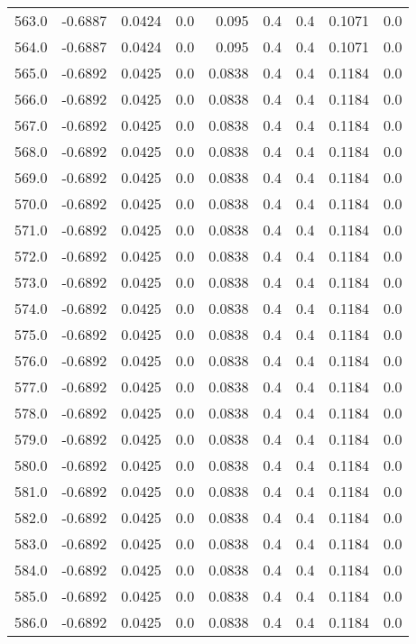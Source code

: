 \begin{longtable}{lrrrrrrrr}
563.0 & -0.6887 & 0.0424 & 0.0 & 0.095 & 0.4 & 0.4 & 0.1071 & 0.0 \\
564.0 & -0.6887 & 0.0424 & 0.0 & 0.095 & 0.4 & 0.4 & 0.1071 & 0.0 \\
565.0 & -0.6892 & 0.0425 & 0.0 & 0.0838 & 0.4 & 0.4 & 0.1184 & 0.0 \\
566.0 & -0.6892 & 0.0425 & 0.0 & 0.0838 & 0.4 & 0.4 & 0.1184 & 0.0 \\
567.0 & -0.6892 & 0.0425 & 0.0 & 0.0838 & 0.4 & 0.4 & 0.1184 & 0.0 \\
568.0 & -0.6892 & 0.0425 & 0.0 & 0.0838 & 0.4 & 0.4 & 0.1184 & 0.0 \\
569.0 & -0.6892 & 0.0425 & 0.0 & 0.0838 & 0.4 & 0.4 & 0.1184 & 0.0 \\
570.0 & -0.6892 & 0.0425 & 0.0 & 0.0838 & 0.4 & 0.4 & 0.1184 & 0.0 \\
571.0 & -0.6892 & 0.0425 & 0.0 & 0.0838 & 0.4 & 0.4 & 0.1184 & 0.0 \\
572.0 & -0.6892 & 0.0425 & 0.0 & 0.0838 & 0.4 & 0.4 & 0.1184 & 0.0 \\
573.0 & -0.6892 & 0.0425 & 0.0 & 0.0838 & 0.4 & 0.4 & 0.1184 & 0.0 \\
574.0 & -0.6892 & 0.0425 & 0.0 & 0.0838 & 0.4 & 0.4 & 0.1184 & 0.0 \\
575.0 & -0.6892 & 0.0425 & 0.0 & 0.0838 & 0.4 & 0.4 & 0.1184 & 0.0 \\
576.0 & -0.6892 & 0.0425 & 0.0 & 0.0838 & 0.4 & 0.4 & 0.1184 & 0.0 \\
577.0 & -0.6892 & 0.0425 & 0.0 & 0.0838 & 0.4 & 0.4 & 0.1184 & 0.0 \\
578.0 & -0.6892 & 0.0425 & 0.0 & 0.0838 & 0.4 & 0.4 & 0.1184 & 0.0 \\
579.0 & -0.6892 & 0.0425 & 0.0 & 0.0838 & 0.4 & 0.4 & 0.1184 & 0.0 \\
580.0 & -0.6892 & 0.0425 & 0.0 & 0.0838 & 0.4 & 0.4 & 0.1184 & 0.0 \\
581.0 & -0.6892 & 0.0425 & 0.0 & 0.0838 & 0.4 & 0.4 & 0.1184 & 0.0 \\
582.0 & -0.6892 & 0.0425 & 0.0 & 0.0838 & 0.4 & 0.4 & 0.1184 & 0.0 \\
583.0 & -0.6892 & 0.0425 & 0.0 & 0.0838 & 0.4 & 0.4 & 0.1184 & 0.0 \\
584.0 & -0.6892 & 0.0425 & 0.0 & 0.0838 & 0.4 & 0.4 & 0.1184 & 0.0 \\
585.0 & -0.6892 & 0.0425 & 0.0 & 0.0838 & 0.4 & 0.4 & 0.1184 & 0.0 \\
586.0 & -0.6892 & 0.0425 & 0.0 & 0.0838 & 0.4 & 0.4 & 0.1184 & 0.0 \\

\end{longtable}
